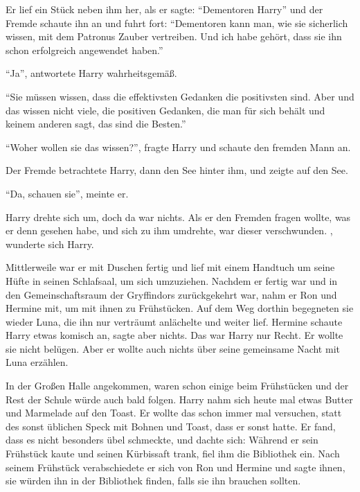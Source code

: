 \begin{rueckblick}
Er lief ein Stück neben ihm her, als er sagte: \enquote{Dementoren \gst Harry} und der Fremde schaute ihn an und fuhrt fort: \enquote{Dementoren kann man, wie sie sicherlich wissen, mit dem Patronus Zauber vertreiben. Und ich habe gehört, dass sie ihn schon erfolgreich angewendet haben.}

\enquote{Ja}, antwortete Harry wahrheitsgemäß.

\enquote{Sie müssen wissen, dass die effektivsten Gedanken die positivsten sind. Aber \gst und das wissen nicht viele, die positiven Gedanken, die man für sich behält und keinem anderen sagt, das sind die Besten.}

\enquote{Woher wollen sie das wissen?}, fragte Harry und schaute den fremden Mann an.

Der Fremde betrachtete Harry, dann den See hinter ihm, und zeigte auf den See.

\enquote{Da, schauen sie}, meinte er.

Harry drehte sich um, doch da war nichts. Als er den Fremden fragen wollte, was er denn gesehen habe, und sich zu ihm umdrehte, war dieser verschwunden. , wunderte sich Harry.
\end{rueckblick}

Mittlerweile war er mit Duschen fertig und lief mit einem Handtuch um seine Hüfte in seinen Schlafsaal, um sich umzuziehen. Nachdem er fertig war und in den Gemeinschaftsraum der Gryffindors zurückgekehrt war, nahm er Ron und Hermine mit, um mit ihnen zu Frühstücken. Auf dem Weg dorthin begegneten sie wieder Luna, die ihn nur verträumt anlächelte und weiter lief. Hermine schaute Harry etwas komisch an, sagte aber nichts. Das war Harry nur Recht. Er wollte sie nicht belügen. Aber er wollte auch nichts über seine gemeinsame Nacht mit Luna erzählen.

In der Großen Halle angekommen, waren schon einige beim Frühstücken und der Rest der Schule würde auch bald folgen. Harry nahm sich heute mal etwas Butter und Marmelade auf den Toast. Er wollte das schon immer mal versuchen, statt des sonst üblichen Speck mit Bohnen und Toast, dass er sonst hatte. Er fand, dass es nicht besonders übel schmeckte, und dachte sich:  Während er sein Frühstück kaute und seinen Kürbissaft trank, fiel ihm die Bibliothek ein. Nach seinem Frühstück verabschiedete er sich von Ron und Hermine und sagte ihnen, sie würden ihn in der Bibliothek finden, falls sie ihn brauchen sollten.

